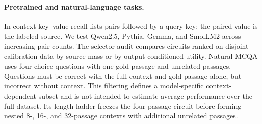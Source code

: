 \documentclass[letterpaper]{article} %
\begin{document}
\paragraph{Pretrained and natural-language tasks.}
In-context key--value recall lists pairs followed by a query key; the paired value is the labeled source.
We test Qwen2.5, Pythia, Gemma, and SmolLM2 across increasing pair counts. The selector audit compares circuits
ranked on disjoint calibration data by source mass or by output-conditioned utility. Natural MCQA uses
four-choice questions with one gold passage and unrelated passages. Questions must be correct with the full
context and gold passage alone, but incorrect without context. This filtering defines a model-specific
context-dependent subset and is not intended to estimate average performance over the full dataset. Its length
ladder freezes the four-passage circuit before forming nested 8-, 16-, and 32-passage contexts with additional
unrelated passages.
\end{document}
